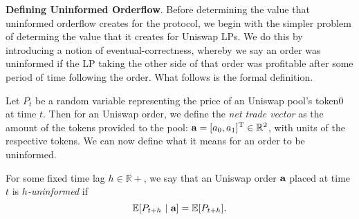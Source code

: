 

    
    \textbf{Defining Uninformed Orderflow}.
    Before determining the value that uninformed orderflow creates for the protocol, we begin with the simpler problem of determing the value that it creates for Uniswap LPs. %
    We do this by introducing a notion of eventual-correctness, whereby we say an order was uninformed if the LP taking the other side of that order was profitable after some period of time following the order. What follows is the formal definition.

    \begin{definition}[$h$-uninformedness]
        Let $P_t$ be a random variable representing the price of an Uniswap pool's token0 at time $t$.
        Then for an Uniswap order, we define the \textit{net trade vector} as the amount of the tokens provided to the pool: $\textbf a  = [a_0, a_1]^\text T \in \mathbb R^2$, with units of the respective tokens. We can now define what it means for an order to be uninformed.

        For some fixed time lag $h \in \mathbb R+$, we say that an Uniswap order $\textbf a$ placed at time $t$ is \textit{$h$-uninformed} if
            $$\mathbb E[P_{t+h} \ | \ \textbf a] = \mathbb E[P_{t+h}].$$  
    \end{definition}

